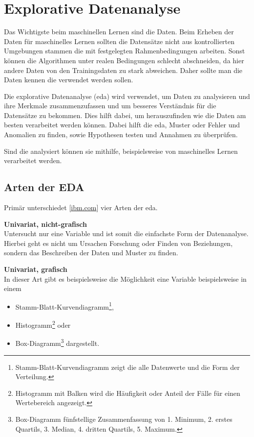\chapter{Explorative Datenanalyse}
Das Wichtigste beim maschinellen Lernen sind die Daten. Beim Erheben der Daten für maschinelles Lernen sollten die Datensätze nicht aus kontrollierten Umgebungen stammen die mit festgelegten Rahmenbedingungen arbeiten. Sonst können die Algorithmen unter realen Bedingungen schlecht abschneiden, da hier andere Daten von den Trainingsdaten zu stark abweichen. Daher sollte man die Daten kennen die verwendet werden sollen.\vspace{0.2cm}

Die explorative Datenanalyse (\Gls{eda}) wird verwendet, um Daten zu analysieren und ihre Merkmale zusammenzufassen und um besseres Verständnis für die Datensätze zu bekommen. Dies hilft dabei, um herauszufinden wie die Daten am besten verarbeitet werden können. Dabei hilft die \Gls{eda}, Muster oder Fehler und Anomalien zu finden, sowie Hypothesen testen und Annahmen zu überprüfen.\vspace{0.2cm}

Sind die analysiert können sie mithilfe, beispielsweise von maschinelles Lernen verarbeitet werden.

\section{Arten der EDA}
Primär unterschiedet [\href{https://www.ibm.com/de-de/cloud/learn/exploratory-data-analysis}{ibm.com}] vier Arten der \Gls{eda}.\vspace{0.2cm}

\textbf{Univariat, nicht-grafisch}\\
Untersucht nur eine Variable und ist somit die einfachste Form der Datenanalyse. Hierbei geht es nicht um Ursachen Forschung oder Finden von Beziehungen, sondern das Beschreiben der Daten und Muster zu finden.\vspace{0.2cm}

\textbf{Univariat, grafisch}\\
In dieser Art gibt es beispielsweise die Möglichkeit eine Variable beispielsweise in einem
\begin{itemize}
	\item Stamm-Blatt-Kurvendiagramm\footnote{Stamm-Blatt-Kurvendiagramm zeigt die alle Datenwerte und die Form der Verteilung.},
	\item Histogramm\footnote{Histogramm mit Balken wird die Häufigkeit oder Anteil der Fälle für einen Wertebereich angezeigt.} oder
	\item Box-Diagramm\footnote{Box-Diagramm fünfstellige Zusammenfassung von 1. Minimum, 2. erstes Quartils, 3. Median, 4. dritten Quartils, 5. Maximum.} dargestellt.
\end{itemize}

